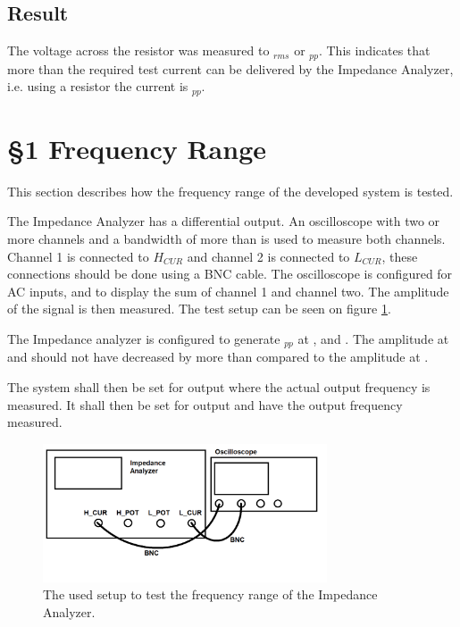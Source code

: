 \subsection*{Result}
The voltage across the resistor was measured to $_{rms}$ or $_{pp}$. This indicates that more than the required test current can be delivered by the Impedance Analyzer, i.e. using a  resistor the current is $_{pp}$.



\section{§1 Frequency Range} \label{subsec:BW_Test}
This section describes how the frequency range of the developed system is tested.

The Impedance Analyzer has a differential output. An oscilloscope with two or more channels and a bandwidth of more than  is used to measure both channels. Channel 1 is connected to $H_{CUR}$ and channel 2 is connected to $L_{CUR}$, these connections should be done using a BNC cable. The oscilloscope is configured for AC inputs, and to display the sum of channel 1 and channel two. The amplitude of the signal is then measured. The test setup can be seen on figure \ref{fig:App_BW_Test}.

The Impedance analyzer is configured to generate $_{pp}$ at ,  and . The amplitude at  and  should not have decreased by more than  compared to the amplitude at .

The system shall then be set for  output where the actual output frequency is measured. It shall then be set for  output and have the output frequency measured.

\begin{figure}[H]
    \centering
    \includegraphics[clip, trim=0 0 0 0, width=0.75\textwidth]{Appendix/Figures/BW_Test.pdf}
    \caption{The used setup to test the frequency range of the Impedance Analyzer.}
    \label{fig:App_BW_Test}
\end{figure}

